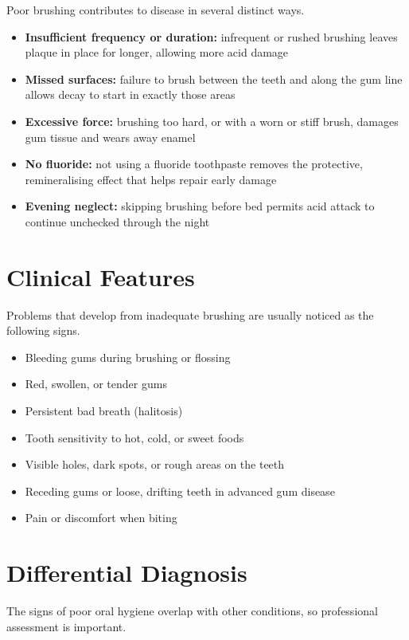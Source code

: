 Poor brushing contributes to disease in several distinct ways.

\begin{itemize}
    \item \textbf{Insufficient frequency or duration:} infrequent or rushed brushing leaves plaque in place for longer, allowing more acid damage
    \item \textbf{Missed surfaces:} failure to brush between the teeth and along the gum line allows decay to start in exactly those areas
    \item \textbf{Excessive force:} brushing too hard, or with a worn or stiff brush, damages gum tissue and wears away enamel
    \item \textbf{No fluoride:} not using a fluoride toothpaste removes the protective, remineralising effect that helps repair early damage
    \item \textbf{Evening neglect:} skipping brushing before bed permits acid attack to continue unchecked through the night
\end{itemize}

\section*{Clinical Features}
Problems that develop from inadequate brushing are usually noticed as the following signs.

\begin{itemize}
    \item Bleeding gums during brushing or flossing
    \item Red, swollen, or tender gums
    \item Persistent bad breath (halitosis)
    \item Tooth sensitivity to hot, cold, or sweet foods
    \item Visible holes, dark spots, or rough areas on the teeth
    \item Receding gums or loose, drifting teeth in advanced gum disease
    \item Pain or discomfort when biting
\end{itemize}

\section*{Differential Diagnosis}
The signs of poor oral hygiene overlap with other conditions, so professional assessment is important.

